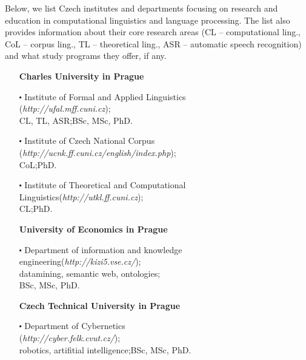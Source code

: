 \begin{multicols}{2}
Below, we list Czech institutes and departments focusing on research and education in computational linguistics and language processing. The list also provides information about their core research areas (CL – computational ling., CoL – corpus ling., TL – theoretical ling., ASR – automatic speech recognition) and what study programs they offer, if any.

\begin{enumerate}
\item[] $\!\!\!\!\!\!$\textbf{Charles University in Prague}
\item[$\centerdot$]Institute of Formal and Applied Linguistics\\(\textit{http://ufal.mff.cuni.cz});\\CL, TL, ASR;\hspace*{1em}BSc, MSc, PhD.
\vspace*{0.009 cm}\item[$\centerdot$]Institute of Czech National Corpus\\(\textit{http://ucnk.ff.cuni.cz/english/index.php});\\CoL;\hspace*{1em}PhD.
\vspace*{0.009 cm}\item[$\centerdot$]Institute of Theoretical and Computational\\Linguistics\hspace*{1em}(\textit{http://utkl.ff.cuni.cz});\\ CL;\hspace*{1em}PhD.
\vspace*{0.09 cm}\item[] $\!\!\!\!\!\!$\textbf{University of Economics in Prague}
\item[$\centerdot$]Department of information and knowledge\\engineering\hspace*{1em}(\textit{http://kizi5.vse.cz/});\\datamining, semantic web, ontologies;\\BSc, MSc, PhD.
\vspace*{0.09 cm}\item[] $\!\!\!\!\!\!$\textbf{Czech Technical University in Prague}
\vspace*{0.009 cm}\item[$\centerdot$]Department of Cybernetics\\(\textit{http://cyber.felk.cvut.cz/});\\ robotics, artifitial intelligence;\hspace*{1em}BSc, MSc, PhD.

\end{enumerate}
\end{multicols}
